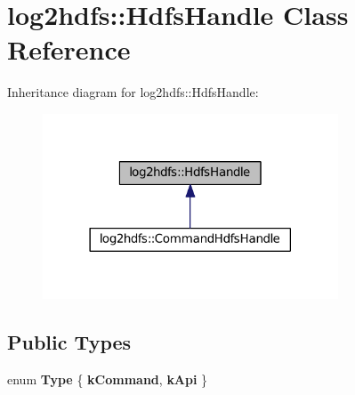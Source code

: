 \hypertarget{classlog2hdfs_1_1HdfsHandle}{}\section{log2hdfs\+:\+:Hdfs\+Handle Class Reference}
\label{classlog2hdfs_1_1HdfsHandle}


Inheritance diagram for log2hdfs\+:\+:Hdfs\+Handle\+:
\nopagebreak
\begin{figure}[H]
\begin{center}
\leavevmode
\includegraphics[width=249pt]{classlog2hdfs_1_1HdfsHandle__inherit__graph}
\end{center}
\end{figure}
\subsection*{Public Types}
\begin{DoxyCompactItemize}
\item 
enum {\bfseries Type} \{ {\bfseries k\+Command}, 
{\bfseries k\+Api}
 \}\hypertarget{classlog2hdfs_1_1HdfsHandle_a3540fd28ddf5b29122034b5f11982189}{}\label{classlog2hdfs_1_1HdfsHandle_a3540fd28ddf5b29122034b5f11982189}

\end{DoxyCompactItemize}
